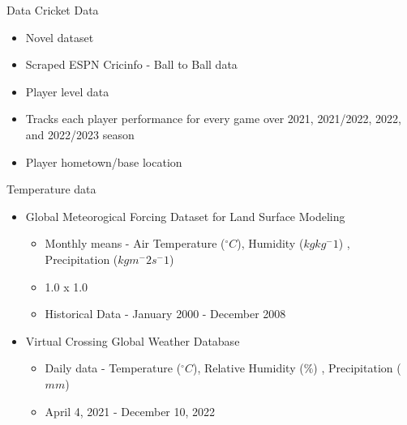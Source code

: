 \documentclass[
  10pt,
  ignorenonframetext,
  twocolumn]{beamer}
\providecommand{\tightlist}{%
  \setlength{\itemsep}{0pt}\setlength{\parskip}{0pt}}
\begin{document}
\begin{frame}{Data}
\protect\hypertarget{data}{}
Cricket Data

\begin{itemize}
\tightlist
\item
  Novel dataset
\item
  Scraped ESPN Cricinfo - Ball to Ball data
\item
  Player level data
\item
  Tracks each player performance for every game over 2021, 2021/2022,
  2022, and 2022/2023 season
\item
  Player hometown/base location
\end{itemize}

Temperature data

\begin{itemize}
\tightlist
\item
  Global Meteorogical Forcing Dataset for Land Surface Modeling

  \begin{itemize}
  \tightlist
  \item
    Monthly means - Air Temperature (\(^\circ C\)), Humidity
    (\(kg kg^-1\)) , Precipitation (\(kg m^-2 s^-1\))
  \item
    1.0 x 1.0
  \item
    Historical Data - January 2000 - December 2008
  \end{itemize}
\item
  Virtual Crossing Global Weather Database

  \begin{itemize}
  \tightlist
  \item
    Daily data - Temperature (\(^\circ C\)), Relative Humidity (\(\%\))
    , Precipitation (\(mm\))
  \item
    April 4, 2021 - December 10, 2022
  \end{itemize}
\end{itemize}
\end{frame}
\end{document}
